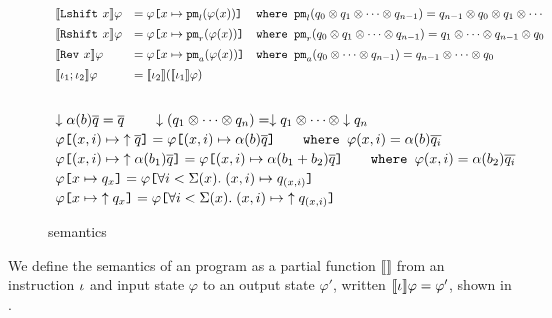 \begin{figure}[t]
{\[\begin{array}{lll}
\llbracket \ilshift{x} \rrbracket\varphi &= \app{{\psem}_{l}(\varphi(x))}{\varphi}{x}
&
\texttt{where  }{\psem}_{l}(q_0\otimes q_1\otimes \cdots \otimes q_{n-1})=q_{n-1}\otimes q_0\otimes q_1 \otimes \cdots
\\[0.5em]

\llbracket \irshift{x} \rrbracket\varphi &= \app{{\psem}_{r}(\varphi(x))}{\varphi}{x}
&
\texttt{where  }{\psem}_{r}(q_0\otimes q_1\otimes \cdots \otimes q_{n-1})=q_1\otimes \cdots \otimes q_{n-1} \otimes q_0
\\[0.5em]

\llbracket \irev{x} \rrbracket\varphi &= \app{{\psem}_{a}(\varphi(x))}{\varphi}{x}
&
\texttt{where  }{\psem}_{a}(q_0\otimes \cdots \otimes q_{n-1})=q_{n-1}\otimes \cdots \otimes q_0
\\[0.5em]

\llbracket \iota_1; \iota_2 \rrbracket\varphi &= \llbracket \iota_2 \rrbracket (\llbracket \iota_1 \rrbracket\varphi)
\end{array}
\]
}
{\footnotesize
$
\begin{array}{l}
\\[0.2em]
\downarrow \alpha(b)\overline{q}=\overline{q}
\qquad
\downarrow (q_1\otimes \cdots \otimes q_n) = \downarrow q_1\otimes \cdots \otimes \downarrow q_n
\\[0.2em]
\app{\uparrow \overline{q}}{\varphi}{(x,i)}=\app{\alpha(b)\overline{q}}{\varphi}{(x,i)}
\qquad \texttt{where  }\varphi(x,i)=\alpha(b)\overline{q_i}
\\[0.2em]
\app{\uparrow \alpha(b_1)\overline{q}}{\varphi}{(x,i)}=\app{\alpha(b_1+b_2)\overline{q}}{\varphi}{(x,i)}
\qquad \texttt{where  }\varphi(x,i)=\alpha(b_2)\overline{q_i}
\\[0.2em]
\app{q_x}{\varphi}{x}=\app{q_{(x,i)}}{\varphi}{\forall i < \Sigma(x).\;(x,i)}
\\[0.2em]
\app{\uparrow q_x}{\varphi}{x}=\app{\uparrow q_{(x,i)}}{\varphi}{\forall i < \Sigma(x).\;(x,i)}
\end{array}
$
}
\vspace*{-0.5em}
\caption{\oqasm semantics}
  \label{fig:deno-sem}
\end{figure}

We define the semantics of an \oqasm program as a partial function
$\llbracket\rrbracket$ from
an instruction $\instr$ and input state $\varphi$ to an output state
$\varphi'$, written 
$\llbracket \instr \rrbracket\varphi=\varphi'$, shown in .

